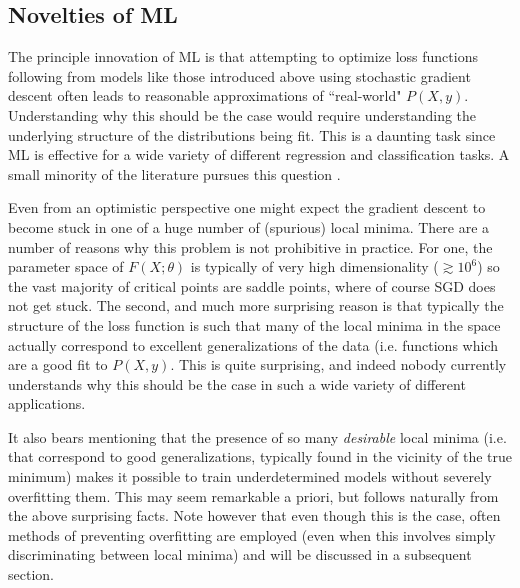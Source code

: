\documentclass{subfile}
\begin{document}
\subsection{Novelties of ML}
The principle innovation of ML is that attempting to optimize loss functions following from models like those introduced above using stochastic gradient descent
often leads to reasonable approximations of ``real-world" $P(X,y)$.  Understanding why this should be the case would require understanding the underlying
structure of the distributions being fit.  This is a daunting task since ML is effective for a wide variety of different regression and classification tasks.  A
small minority of the literature pursues this question \cite{renorm,deepcheap}.

Even from an optimistic perspective one might expect the gradient descent to become stuck in one of a huge number of (spurious) local minima.  There are a
number of reasons why this problem is not prohibitive in practice.  For one, the parameter space of $F(X;\theta)$ is typically of very high dimensionality
($\gtrsim 10^{6}$) so the vast majority of critical points are saddle points, where of course SGD does not get stuck.  The second, and much more surprising
reason is that typically the structure of the loss function is such that many of the local minima in the space actually correspond to excellent generalizations
of the data (i.e. functions which are a good fit to $P(X,y)$.  This is quite surprising, and indeed nobody currently understands why this should be the case in
such a wide variety of different applications.

It also bears mentioning that the presence of so many \emph{desirable} local minima (i.e. that correspond to good generalizations, typically found in the
vicinity of the true minimum) makes it possible to train underdetermined models without severely overfitting them.  This may seem remarkable a priori, but
follows naturally from the above surprising facts.  Note however that even though this is the case, often methods of preventing overfitting are employed (even
when this involves simply discriminating between local minima) and will be discussed in a subsequent section.
\end{document}
